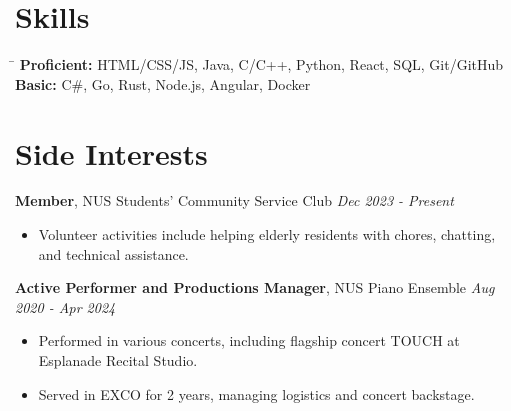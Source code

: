 \documentclass[a4paper,10pt]{article}
\begin{document}
\section*{Skills}
\begin{tabbing}
\hspace{4in} \= \hspace{1in} \kill
\textbf{Proficient:} \> HTML/CSS/JS, Java, C/C++, Python, React, SQL, Git/GitHub \\
\textbf{Basic:} \> C\#, Go, Rust, Node.js, Angular, Docker \\
\end{tabbing}

\section*{Side Interests}
\textbf{Member}, NUS Students' Community Service Club \hfill \textit{Dec 2023 - Present}
\begin{itemize}[leftmargin=*]
    \item Volunteer activities include helping elderly residents with chores, chatting, and technical assistance.
\end{itemize}

\textbf{Active Performer and Productions Manager}, NUS Piano Ensemble \hfill \textit{Aug 2020 - Apr 2024}
\begin{itemize}[leftmargin=*]
    \item Performed in various concerts, including flagship concert TOUCH at Esplanade Recital Studio.
    \item Served in EXCO for 2 years, managing logistics and concert backstage.
\end{itemize}
\end{document}

